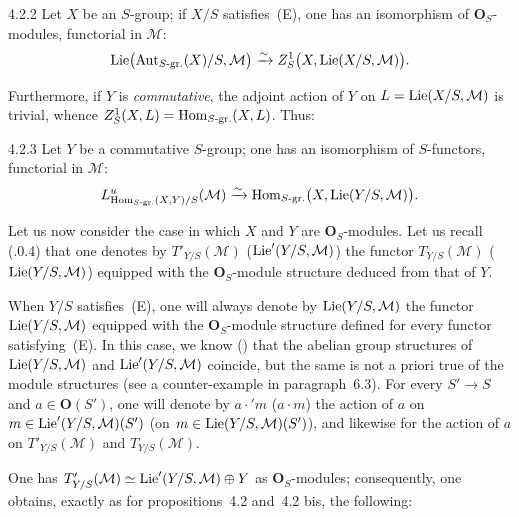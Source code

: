 \begin{corollary}{4.2.2}\label{II.4.2.2}
Let \(X\) be an \(S\)-group; if \(X/S\) satisfies~(E), one has an isomorphism
of \(\mathbf{O}_{S}\)-modules, functorial in \(\mathcal{M}\):
\[
\operatorname{Lie}\bigl(\operatorname{Aut}_{S\text{-gr.}}(X)/S,\mathcal{M}\bigr)
\xrightarrow{\sim}
Z^{1}_{S}\bigl(X,\operatorname{Lie}(X/S,\mathcal{M})\bigr).
\]
\end{corollary}

{\renewcommand{\thefootnote}{(59)}}
Furthermore, if \(Y\) is \emph{commutative}, the adjoint action of \(Y\) on
\(L=\operatorname{Lie}(X/S,\mathcal{M})\) is trivial, %
whence \(Z^{1}_{S}(X,L)=\operatorname{Hom}_{S\text{-gr.}}(X,L)\). Thus:

\begin{corollary}{4.2.3}\label{II.4.2.3}
Let \(Y\) be a commutative \(S\)-group; one has an isomorphism of
\(S\)-functors, functorial in \(\mathcal{M}\):
\[
L^{u}_{\operatorname{Hom}_{S\text{-gr.}}(X,Y)/S}(\mathcal{M})
\xrightarrow{\sim}
\operatorname{Hom}_{S\text{-gr.}}\bigl(X,\operatorname{Lie}(Y/S,\mathcal{M})\bigr).
\]
\end{corollary}

\label{II.4.3}
Let us now consider the case in which \(X\) and \(Y\) are
\(\mathbf{O}_{S}\)-modules. Let us recall (.0.4) that one denotes by
\(T'_{Y/S}(\mathcal{M})\) (\resp \(\operatorname{Lie}'(Y/S,\mathcal{M})\)) the functor
\(T_{Y/S}(\mathcal{M})\) (\resp \(\operatorname{Lie}(Y/S,\mathcal{M})\)) equipped with the
\(\mathbf{O}_{S}\)-module structure deduced from that of \(Y\).

When \(Y/S\) satisfies~(E), one will always denote by
\(\operatorname{Lie}(Y/S,\mathcal{M})\) the functor \(\operatorname{Lie}(Y/S,\mathcal{M})\) equipped with
the \(\mathbf{O}_{S}\)-module structure defined for every functor
satisfying~(E). In this case, we know () that the abelian group
structures of \(\operatorname{Lie}(Y/S,\mathcal{M})\) and \(\operatorname{Lie}'(Y/S,\mathcal{M})\)
coincide, but the same is not a priori true of the module structures (see a
counter-example in paragraph~6.3). For every \(S'\to S\) and
\(a\in\mathbf{O}(S')\), one will denote by \(a\cdot' m\) (\resp \(a\cdot m\))
the action of \(a\) on \(m\in\operatorname{Lie}'(Y/S,\mathcal{M})(S')\) (\resp on
\(m\in\operatorname{Lie}(Y/S,\mathcal{M})(S')\)), and likewise for the action of \(a\) on
\(T'_{Y/S}(\mathcal{M})\) and \(T_{Y/S}(\mathcal{M})\).

One has \(T'_{Y/S}(\mathcal{M})\simeq\operatorname{Lie}'(Y/S,\mathcal{M})\oplus Y\) as
\(\mathbf{O}_{S}\)-modules; consequently, one obtains, exactly as for
propositions~4.2 and~4.2 bis, the following:


